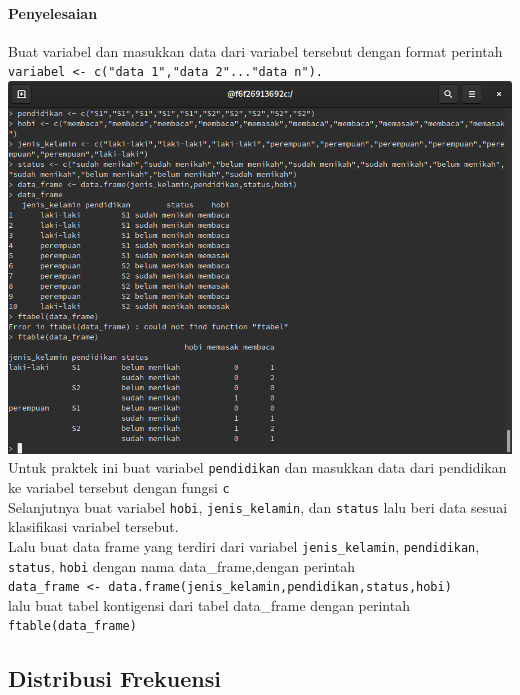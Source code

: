 \documentclass[a4paper,12pt]{article}
\begin{document}
\paragraph{Penyelesaian\\}
Buat variabel dan masukkan data dari variabel tersebut dengan format perintah\\ \texttt{variabel <- c("data 1","data 2"..."data n").}\\
\includegraphics[width=\linewidth]{2}\\
Untuk praktek ini buat variabel \texttt{pendidikan} dan masukkan data dari pendidikan ke variabel tersebut dengan fungsi \texttt{c}\\
Selanjutnya buat variabel \texttt{hobi}, \texttt{jenis\_kelamin}, dan \texttt{status} lalu beri data sesuai klasifikasi variabel tersebut.\\
Lalu buat data frame yang terdiri dari variabel \texttt{jenis\_kelamin}, \texttt{pendidikan}, \texttt{status}, \texttt{hobi} dengan nama data\_frame,dengan perintah\\ 
\texttt{data\_frame <- data.frame(jenis\_kelamin,pendidikan,status,hobi)}\\
lalu buat tabel kontigensi dari tabel data\_frame dengan perintah\\
\texttt{ftable(data\_frame)}

\subsection{Distribusi Frekuensi}
\end{document}
